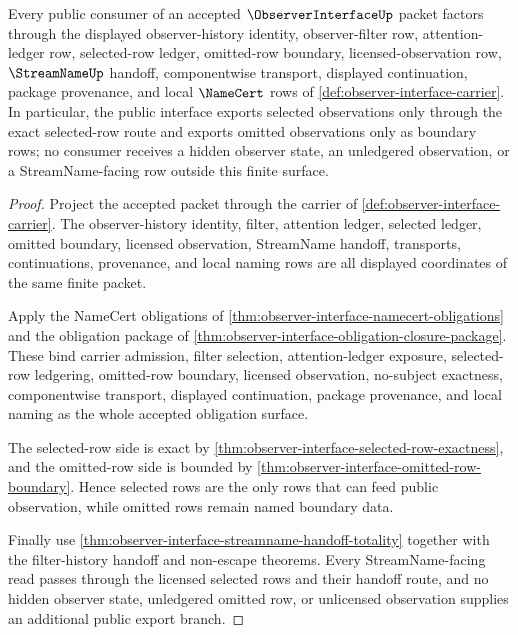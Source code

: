 \begin{theorem}
\label{thm:observer-interface-public-export}
Every public consumer of an accepted $\ObserverInterfaceUp$ packet factors through the displayed observer-history identity, observer-filter row, attention-ledger row, selected-row ledger, omitted-row boundary, licensed-observation row, $\StreamNameUp$ handoff, componentwise transport, displayed continuation, package provenance, and local $\NameCert$ rows of \autoref{def:observer-interface-carrier}. In particular, the public interface exports selected observations only through the exact selected-row route and exports omitted observations only as boundary rows; no consumer receives a hidden observer state, an unledgered observation, or a StreamName-facing row outside this finite surface.
\end{theorem}
\begin{proof}
Project the accepted packet through the carrier of \autoref{def:observer-interface-carrier}. The observer-history identity, filter, attention ledger, selected ledger, omitted boundary, licensed observation, StreamName handoff, transports, continuations, provenance, and local naming rows are all displayed coordinates of the same finite packet.

Apply the NameCert obligations of \autoref{thm:observer-interface-namecert-obligations} and the obligation package of \autoref{thm:observer-interface-obligation-closure-package}. These bind carrier admission, filter selection, attention-ledger exposure, selected-row ledgering, omitted-row boundary, licensed observation, no-subject exactness, componentwise transport, displayed continuation, package provenance, and local naming as the whole accepted obligation surface.

The selected-row side is exact by \autoref{thm:observer-interface-selected-row-exactness}, and the omitted-row side is bounded by \autoref{thm:observer-interface-omitted-row-boundary}. Hence selected rows are the only rows that can feed public observation, while omitted rows remain named boundary data.

Finally use \autoref{thm:observer-interface-streamname-handoff-totality} together with the filter-history handoff and non-escape theorems. Every StreamName-facing read passes through the licensed selected rows and their handoff route, and no hidden observer state, unledgered omitted row, or unlicensed observation supplies an additional public export branch.
\end{proof}


